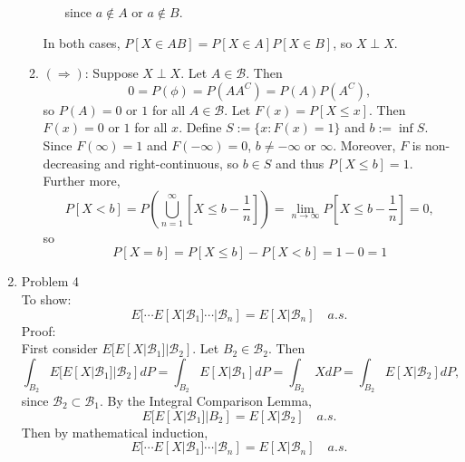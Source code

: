 \documentclass{article}
\newcommand{\B}{\mathcal{B}}
\begin{document}
\begin{enumerate}
\begin{enumerate}
\begin{enumerate}
        since $a \notin A$ or $a \notin B$.
    \end{enumerate}
    In both cases,
    $P[X \in AB] = P[X \in A] P[X \in B]$,
    so $X \perp X$.
\item $(\Rightarrow)$:
    Suppose $X \perp X$.
    Let $A \in \B$.
    Then
\[
0 = P(\phi) = P(AA^C) = P(A) P(A^C),
\]
so $P(A) = 0 \text{ or } 1$ for all $A \in \B$.
Let $F(x) = P[X \leq x]$.
Then $F(x) = 0 \text{ or } 1$ for all $x$.
Define $S := \{x: F(x) = 1\}$ and $b := \inf S$.
Since $F(\infty) = 1$ and $F(-\infty) = 0$,
$b \neq -\infty \text{ or } \infty$.
Moreover, 
$F$ is non-decreasing and right-continuous,
so $b \in S$
and thus $P[X \leq b] = 1$.
Further more,
\[
P[X < b] = P(\bigcup_{n=1}^\infty [X \leq b - \frac{1}{n}]) = \lim_{n \to \infty} P[X \leq b - \frac{1}{n}] = 0, 
\]
so
\[
P[X = b] = P[X \leq b] - P[X < b] = 1 - 0 = 1
\]
\end{enumerate}
\item Problem 4 \\
To show:
\[
E[\cdots E[X | \B_1] \cdots | \B_n] = E[X | \B_n] \quad a.s.
\]
Proof: \\
First consider $E[E[X|\B_1] | \B_2]$.
Let $B_2 \in \B_2$.
Then 
\[
\int_{B_2} E[ E[X|\B_1] | \B_2] dP 
= \int_{B_2} E[X|\B_1] dP 
= \int_{B_2} X dP 
= \int_{B_2} E[X|\B_2] dP,
\]
since $\B_2 \subset \B_1$.
By the Integral Comparison Lemma,
\[
E[ E[X | \B_1] | B_2] = E[X | \B_2] \quad a.s.
\]
Then by mathematical induction,
\[
E[\cdots E[X | \B_1] \cdots | \B_n] = E[X | \B_n] \quad a.s.
\]
\end{enumerate}
\end{document}
